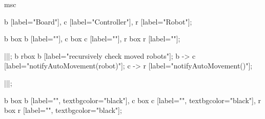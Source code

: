 
\begin{msc}
msc
{

b [label="Board"],
c [label="Controller"],
r [label="Robot"];

b box b [label=""],
c box c [label=""],
r box r [label=""];

|||;
b rbox b [label="recursively check moved robots"];
b -> c [label="notifyAutoMovement(robot)"];
c -> r [label="notifyAutoMovement()"];

|||;

b box b [label="", textbgcolor="black"],
c box c [label="", textbgcolor="black"],
r box r [label="", textbgcolor="black"];

}
\end{msc}
